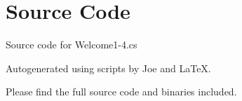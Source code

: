 \documentclass[12pt]{article}
\begin{document}
\maketitle
\pagebreak


\section{Source Code}

Source code for \textsf{Welcome1-4.cs}


\newpage



\newpage

Autogenerated using scripts by Joe and \LaTeX.

Please find the full source code and binaries included.
\end{document}
